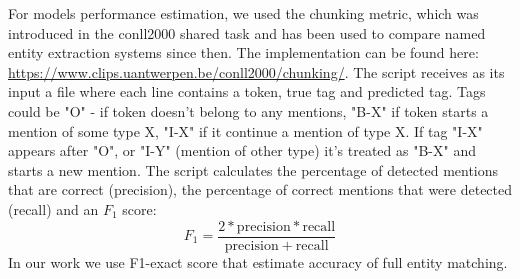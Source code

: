 \documentclass[a4paper,fleqn,longmktitle]{cas-dc}
\begin{document}
\label{section:quality_metrics}
For models performance estimation, we used the chunking metric, which was introduced in the conll2000 shared task and has been used to compare named entity extraction systems since then. The implementation can be found here: \url{https://www.clips.uantwerpen.be/conll2000/chunking/}. The script receives as its input a file where each line contains a token, true tag and predicted tag. Tags could be "O" - if token doesn't belong to any mentions, "B-X" if token starts a mention of some type X, "I-X" if it continue a mention of type X. If tag "I-X" appears after "O", or "I-Y" (mention of other type) it's treated as "B-X" and starts a new mention. The script calculates the percentage of detected mentions that are correct (precision), the percentage of correct mentions that were detected (recall) and an $F_1$ score: $$F_1 = \frac{2*\mathrm{precision}*\mathrm{recall}}{\mathrm{precision} + \mathrm{recall}}$$
In our work we use F1-exact score that estimate accuracy of full entity matching. 



%

\label{section:pipeline}
\end{document}
